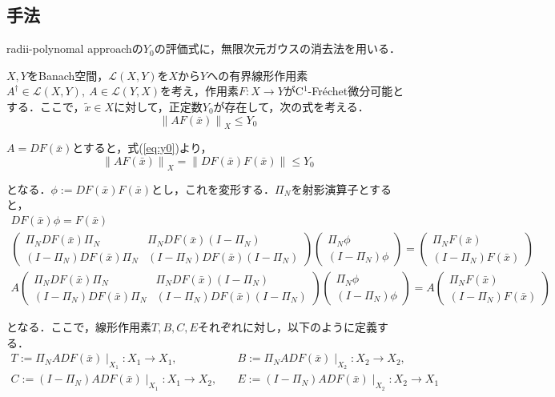 \documentclass[11pt,a4paper]{jsarticle}
\theoremstyle{definition}
\begin{document}
\subsection{手法}
radii-polynomal approachの$Y_0$の評価式に，無限次元ガウスの消去法を用いる．

$X,Y$をBanach空間，$\mathcal{L}(X,Y)$を$X$から$Y$への有界線形作用素$A^\dagger \in \mathcal{L}(X,Y),\ A \in \mathcal{L}(Y,X)$を考え，作用素$F:X \rightarrow Y$がC$^1$-Fr\'{e}chet微分可能とする．ここで，$\tilde{x}\in X$に対して，正定数$Y_0$が存在して，次の式を考える．
\begin{equation}
  \left\| AF(\bar{x}) \right\|_X \leq Y_0
  \label{eq:y0}
\end{equation}

$A=DF(\bar{x})$とすると，式(\ref{eq:y0})より，
\begin{equation}
  \left\| AF(\bar{x}) \right\|_X = \left\| DF(\bar{x}) F(\bar{x}) \right\| \leq Y_0
\end{equation}

となる．$\phi:=DF(\bar{x}) F(\bar{x})$とし，これを変形する．$\Pi_N$を射影演算子とすると，
\begin{gather*}
  DF(\bar{x}) \phi = F(\bar{x})
  \\
  \begin{pmatrix}
    \Pi_N DF(\bar{x}) \Pi_N & \Pi_N DF(\bar{x}) (I-\Pi_N) \\
    (I-\Pi_N) DF(\bar{x}) \Pi_N & (I-\Pi_N) DF(\bar{x}) (I-\Pi_N)
  \end{pmatrix}
  \begin{pmatrix}
    \Pi_N \phi \\
    (I-\Pi_N) \phi
  \end{pmatrix}
  =
  \begin{pmatrix}
    \Pi_N F(\bar{x}) \\
    (I - \Pi_N) F(\bar{x})
  \end{pmatrix}
  \\A
  \begin{pmatrix}
    \Pi_N DF(\bar{x}) \Pi_N & \Pi_N DF(\bar{x}) (I-\Pi_N) \\
    (I-\Pi_N) DF(\bar{x}) \Pi_N & (I-\Pi_N) DF(\bar{x}) (I-\Pi_N)
  \end{pmatrix}
  \begin{pmatrix}
    \Pi_N \phi \\
    (I-\Pi_N) \phi
  \end{pmatrix}
  =A
  \begin{pmatrix}
    \Pi_N F(\bar{x}) \\
    (I - \Pi_N) F(\bar{x})
  \end{pmatrix}
\end{gather*}

となる．ここで，線形作用素$T,B,C,E$それぞれに対し，以下のように定義する．
\begin{equation}
  \begin{split}
    T:= \Pi_N ADF(\bar{x}) \mid _{X_1}:X_1 \rightarrow X_1,\quad & B:= \Pi_N ADF(\bar{x}) \mid _{X_2}:X_2 \rightarrow X_2, \\
    C:= (I-\Pi_N) ADF(\bar{x}) \mid _{X_1}:X_1 \rightarrow X_2,\quad & E:= (I-\Pi_N) ADF(\bar{x}) \mid _{X_2}:X_2 \rightarrow X_1
  \end{split}
\end{equation}
\end{document}
